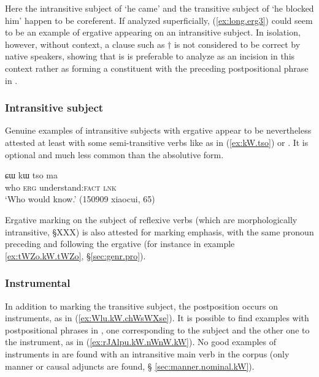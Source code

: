 Here the intransitive subject of   `he came' and the transitive subject of    `he blocked him' happen to be coreferent. If analyzed superficially, (\ref{ex:long.erg3}) could seem to be an example of ergative appearing on an intransitive subject. In isolation, however, without context, a clause such as $\dagger$ is not considered to be correct by native speakers, showing that is is preferable to analyze   as an incision in this context rather as forming a constituent with the preceding postpositional phrase in .

\subsubsection{Intransitive subject} \label{sec:S.kW}
Genuine examples of intransitive subjects with ergative appear to be nevertheless attested at least with some semi-transitive verbs like  as in (\ref{ex:kW.tso}) or . It is optional and much less common than the absolutive form.

\begin{exe}
\ex \label{ex:kW.tso}
\gll ɕɯ kɯ tso ma \\
who \textsc{erg} understand:\textsc{fact} \textsc{lnk} \\
\glt `Who would know.' (150909 xiaocui, 65)
\end{exe}

Ergative marking on the subject of reflexive verbs (which are morphologically intransitive, §XXX) is also attested for marking emphasis, with the same pronoun preceding and following the ergative (for instance  in example \ref{ex:tWZo.kW.tWZo}, §\ref{sec:genr.pro}).

\subsubsection{Instrumental} \label{sec:instr.kW}
In addition to marking the transitive subject, the postposition  occurs on instruments, as in (\ref{ex:Wlu.kW.chWsWXse}). It is possible to find examples with  postpositional phrases in , one corresponding to the subject and the other one to the instrument, as in (\ref{ex:rJAlpu.kW.nWnW.kW}). No good examples of instruments in  are found with an intransitive main verb in the corpus (only manner or causal adjuncts are found, § \ref{sec:manner.nominal.kW}).

